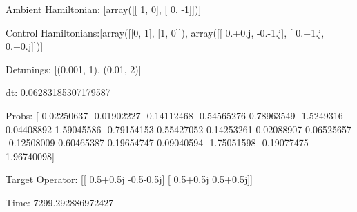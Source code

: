 \documentclass{article}
\begin{document}
    

\newpage

Ambient Hamiltonian: [array([[ 1,  0],
       [ 0, -1]])]

Control Hamiltonians:[array([[0, 1],
       [1, 0]]), array([[ 0.+0.j, -0.-1.j],
       [ 0.+1.j,  0.+0.j]])]

Detunings: [(0.001, 1), (0.01, 2)]

 dt: 0.06283185307179587

Probs: [ 0.02250637 -0.01902227 -0.14112468 -0.54565276  0.78963549 -1.5249316
  0.04408892  1.59045586 -0.79154153  0.55427052  0.14253261  0.02088907
  0.06525657 -0.12508009  0.60465387  0.19654747  0.09040594 -1.75051598
 -0.19077475  1.96740098]

Target Operator: [[ 0.5+0.5j -0.5-0.5j]
 [ 0.5+0.5j  0.5+0.5j]]

Time: 7299.292886972427
\end{document}
